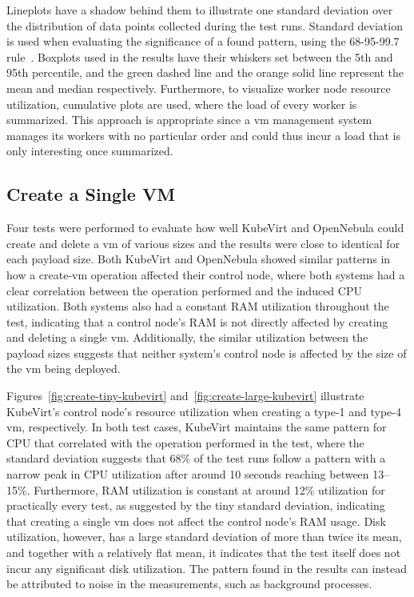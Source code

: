 \documentclass{kththesis}
\begin{document}
\begin{enumerate}
Lineplots have a shadow behind them to illustrate one standard deviation over the distribution of data points collected during the test runs. Standard deviation is used when evaluating the significance of a found pattern, using the 68-95-99.7 rule\ \cite{68-95-99-rule}. Boxplots used in the results have their whiskers set between the 5th and 95th percentile, and the green dashed line and the orange solid line represent the mean and median respectively. Furthermore, to visualize worker node resource utilization, cumulative plots are used, where the load of every worker is summarized. This approach is appropriate since a \Gls{vm} management system manages its workers with no particular order and could thus incur a load that is only interesting once summarized. 

\subsection{Create a Single VM}
Four tests were performed to evaluate how well KubeVirt and OpenNebula could create and delete a \Gls{vm} of various sizes and the results were close to identical for each payload size. Both KubeVirt and OpenNebula showed similar patterns in how a create-\Gls{vm} operation affected their control node, where both systems had a clear correlation between the operation performed and the induced CPU utilization. Both systems also had a constant RAM utilization throughout the test, indicating that a control node's RAM is not directly affected by creating and deleting a single \Gls{vm}. Additionally, the similar utilization between the payload sizes suggests that neither system's control node is affected by the size of the \Gls{vm} being deployed.

Figures\ \ref{fig:create-tiny-kubevirt} and\ \ref{fig:create-large-kubevirt} illustrate KubeVirt's control node's resource utilization when creating a type-1 and type-4 \Gls{vm}, respectively. In both test cases, KubeVirt maintains the same pattern for CPU that correlated with the operation performed in the test, where the standard deviation suggests that 68\% of the test runs follow a pattern with a narrow peak in CPU utilization after around 10 seconds reaching between 13--15\%. Furthermore, RAM utilization is constant at around 12\% utilization for practically every test, as suggested by the tiny standard deviation, indicating that creating a single \Gls{vm} does not affect the control node's RAM usage. Disk utilization, however, has a large standard deviation of more than twice its mean, and together with a relatively flat mean, it indicates that the test itself does not incur any significant disk utilization. The pattern found in the results can instead be attributed to noise in the measurements, such as background processes. 


\end{enumerate}
\end{document}
